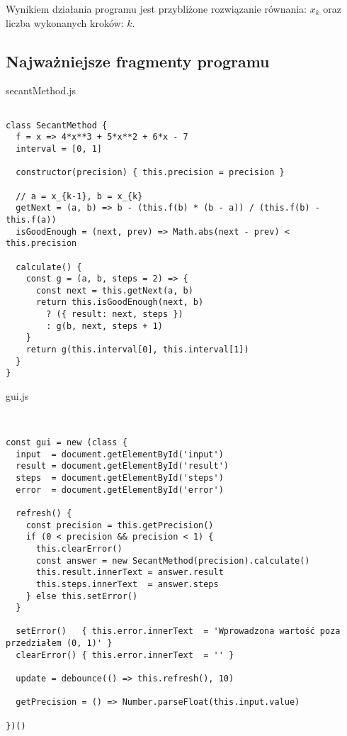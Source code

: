 \documentclass[12pt]{article}
\begin{document}
Wynikiem działania programu jest przybliżone rozwiązanie równania: $x_k$ oraz liczba wykonanych kroków: $k$.
\newpage
\subsection{Najważniejsze fragmenty programu}
secantMethod.js
\begin{verbatim}

class SecantMethod {
  f = x => 4*x**3 + 5*x**2 + 6*x - 7
  interval = [0, 1]

  constructor(precision) { this.precision = precision }

  // a = x_{k-1}, b = x_{k}
  getNext = (a, b) => b - (this.f(b) * (b - a)) / (this.f(b) - this.f(a))
  isGoodEnough = (next, prev) => Math.abs(next - prev) < this.precision

  calculate() {
    const g = (a, b, steps = 2) => {
      const next = this.getNext(a, b)
      return this.isGoodEnough(next, b)
        ? ({ result: next, steps })
        : g(b, next, steps + 1)
    }
    return g(this.interval[0], this.interval[1])
  }
}

\end{verbatim}
gui.js
\begin{verbatim}


const gui = new (class {
  input  = document.getElementById('input')
  result = document.getElementById('result')
  steps  = document.getElementById('steps')
  error  = document.getElementById('error')

  refresh() {
    const precision = this.getPrecision()
    if (0 < precision && precision < 1) {
      this.clearError()
      const answer = new SecantMethod(precision).calculate()
      this.result.innerText = answer.result
      this.steps.innerText  = answer.steps
    } else this.setError()
  }

  setError()   { this.error.innerText  = 'Wprowadzona wartość poza przedziałem (0, 1)' }
  clearError() { this.error.innerText  = '' }

  update = debounce(() => this.refresh(), 10)

  getPrecision = () => Number.parseFloat(this.input.value)

})()
\end{verbatim}
\end{document}
